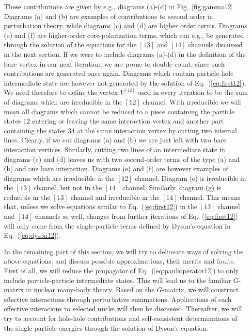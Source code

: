 \documentclass{article}
\begin{document}
These contributions
are given by e.g., diagrams (a)-(d) in Fig.\ \ref{fig:gamma12}.
Diagrams (a) and (b) are examples of contributions to second order
in perturbation theory, while diagrams (c) and (d) are higher
order terms. Diagrams (e) and (f) are higher-order core-polarization terms,
which can e.g., be generated through the solution of the equations for
the $[13]$ and $[14]$ channels discussed in the next section.
If we were to include diagrams (a)-(d) in the definition of the bare
vertex in our next iteration,
we are prone to double-count, since such contributions are generated
once again. Diagrams which contain particle-hole intermediate state are however
not generated by the solution of Eq.\ (\ref{eq:first12}).
We need therefore to define the vertex $V^{[12]}$ used in every iteration
to be the sum of diagrams which are irreducible in the $[12]$ channel.
With irreducible we will mean all diagrams which cannot be reduced to
a piece containing the particle states $12$  entering or leaving
the same interaction vertex
and another   part containing the states $34$ at the same interaction
vertex by cutting two internal lines.
Clearly, if we cut diagrams (a) and (b) we are just left with two bare
interaction vertices. Similarly, cutting two lines of an intermediate
state in diagrams (c) and (d) leaves us with two second-order terms
of the type (a) and (b) and one bare interaction.
Diagrams (e) and (f) are however examples of diagrams which are
irreducible in the $[12]$ channel. Diagram (e) is
irreducible in the $[13]$ channel, but not in the $[14]$ channel.
Similarly, diagram (g) is reducible in the $[13]$ channel and
irreducible in the $[14]$ channel.
This means that, unless we solve equations similar to Eq.\ (\ref{eq:first12})
in the $[13]$ channel and $[14]$ channels as well, changes
from further iterations
of Eq.\ (\ref{eq:first12}) will only come from
the single-particle terms defined
by Dyson's equation in Eq.\ (\ref{eq:dyson12}).

In the remaining part of this section, we will try to delineate ways
of solving the above equations, and discuss possible approximations,
their merits and faults. First of all, we will reduce
the propagator of  Eq.\ (\ref{eq:paulioperator12}) to only include
particle-particle intermediate states. This will lead us to the familiar
$G$-matrix in nuclear many-body theory.
Based on the $G$-matrix, we will construct effective interactions
through perturbative summations. Applications of such
effective interacions to selected nuclei will then be discussed.
Thereafter, we will try to
account for hole-hole contributions and 
self-consistent determinations of the single-particle
energies through the solution of Dyson's equation.
\end{document}

